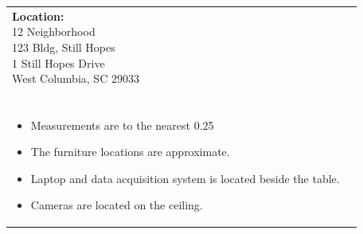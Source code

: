 \documentclass[12pt]{article}
\begin{document}
    \vspace*{\fill}  %
    \begin{table}[H]
	\begin{tabular}{l l}
		\makecell[lt]{
			\textbf{Location:}\\
     		12 Neighborhood \\
 		    123 Bldg, Still Hopes\\
           	1 Still Hopes Drive\\
           	West Columbia, SC 29033\\\\
        }   	
        &	
		\makecell[tp{5in}]{
		\textbf{Notes:}\\
		\vspace{-8mm}  %
		\begin{itemize}
			\setlength\itemsep{-3mm}  %
			\item Measurements are to the nearest \SI{0.25}{\inch}
			\item The furniture locations are approximate.
			\item Laptop and data acquisition system is located beside the table.
			\item Cameras are located on the ceiling.
		\end{itemize}
		}	
			
	\end{tabular}
	\vspace{-8mm} %
\end{table}

    
\end{document}
